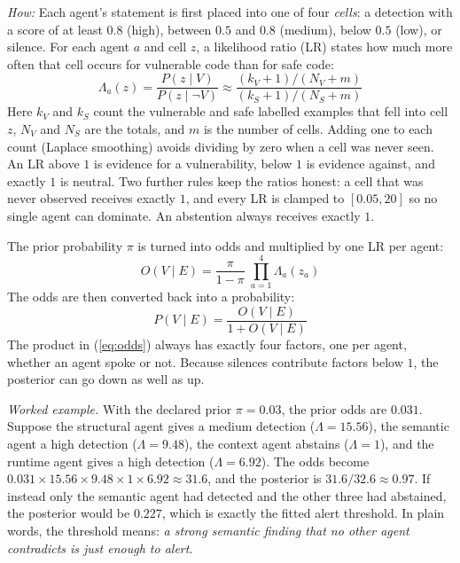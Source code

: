 \documentclass[conference]{IEEEtran}
\begin{document}
\textit{How:} Each agent's statement is first placed into one of four
\emph{cells}: a detection with a score of at least $0.8$ (high), between
$0.5$ and $0.8$ (medium), below $0.5$ (low), or silence. For each agent $a$
and cell $z$, a likelihood ratio (LR) states how much more often that cell
occurs for vulnerable code than for safe code:
\begin{equation}
\Lambda_a(z)=\frac{P(z \mid V)}{P(z \mid \neg V)}
\approx \frac{(k_{V}+1)/(N_{V}+m)}{(k_{S}+1)/(N_{S}+m)}
\label{eq:lr}
\end{equation}
Here $k_V$ and $k_S$ count the vulnerable and safe labelled examples that
fell into cell $z$, $N_V$ and $N_S$ are the totals, and $m$ is the number
of cells. Adding one to each count (Laplace smoothing) avoids dividing by
zero when a cell was never seen. An LR above $1$ is evidence for a
vulnerability, below $1$ is evidence against, and exactly $1$ is neutral.
Two further rules keep the ratios honest: a cell that was never observed
receives exactly $1$, and every LR is clamped to $[0.05, 20]$ so no single
agent can dominate. An abstention always receives exactly $1$.

The prior probability $\pi$ is turned into odds and multiplied by one LR
per agent:
\begin{equation}
O(V \mid E)=\frac{\pi}{1-\pi}\;\prod_{a=1}^{4}\Lambda_a(z_a)
\label{eq:odds}
\end{equation}
The odds are then converted back into a probability:
\begin{equation}
P(V \mid E)=\frac{O(V \mid E)}{1+O(V \mid E)}
\label{eq:posterior}
\end{equation}
The product in (\ref{eq:odds}) always has exactly four factors, one per
agent, whether an agent spoke or not. Because silences contribute factors
below $1$, the posterior can go down as well as up.

\textit{Worked example.} With the declared prior $\pi=0.03$, the prior odds
are $0.031$. Suppose the structural agent gives a medium detection
($\Lambda=15.56$), the semantic agent a high detection ($\Lambda=9.48$),
the context agent abstains ($\Lambda=1$), and the runtime agent gives a
high detection ($\Lambda=6.92$). The odds become
$0.031\times15.56\times9.48\times1\times6.92\approx31.6$, and the posterior
is $31.6/32.6\approx0.97$. If instead only the semantic agent had
detected and the other three had abstained, the posterior would be $0.227$,
which is exactly the fitted alert threshold. In plain words, the threshold
means: \emph{a strong semantic finding that no other agent contradicts is
just enough to alert}.
\end{document}
